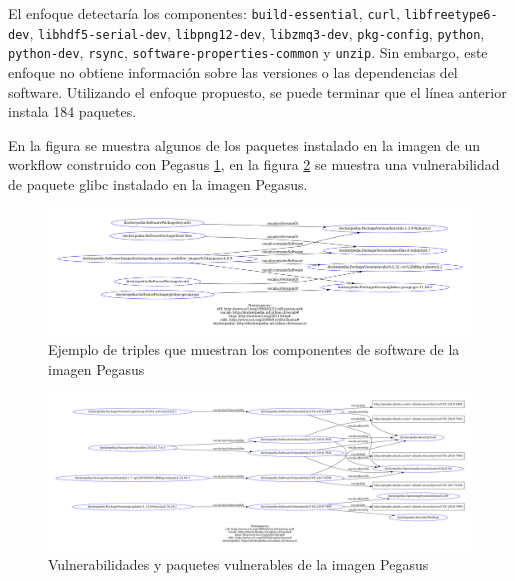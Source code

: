 El enfoque detectaría los componentes: \verb|build-essential|, \verb|curl|, \verb|libfreetype6-dev|, \verb|libhdf5-serial-dev|, \verb|libpng12-dev|, \verb|libzmq3-dev|, \verb|pkg-config|, \verb|python|, \verb|python-dev|, \verb|rsync|, \verb|software-properties-common| y  \verb|unzip|. Sin embargo, este enfoque no obtiene información sobre las versiones o las dependencias del software. Utilizando el  enfoque propuesto, se puede terminar que el línea anterior instala 184 paquetes.

En la figura se muestra algunos de los paquetes instalado en la imagen de un workflow construido con Pegasus \ref{fig:packages-pegasus}, en la figura \ref{fig:vulnerability-pegasus} se muestra una vulnerabilidad de paquete glibc instalado en la imagen Pegasus.


\begin{figure}[t]
    \hspace*{-4cm}   
    \includegraphics[width=1.3\textwidth]{Figures/packages}
     \caption[Paquetes de la imagen Pegasus]{Ejemplo de triples que muestran los componentes de software de la imagen Pegasus}
    \label{fig:packages-pegasus}
      
\end{figure}



\begin{figure}[t]
    \hspace*{-4cm}   
    \includegraphics[width=1.3\textwidth]{Figures/packages-vuln}
      \caption[Paquetes y vulnerabilidades de la imagen Pegasus]{Vulnerabilidades y paquetes vulnerables de la imagen Pegasus}
    \label{fig:vulnerability-pegasus}
\end{figure}
